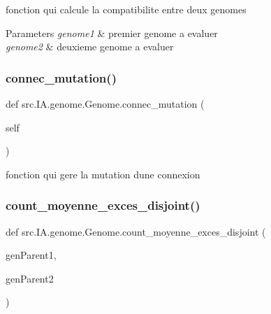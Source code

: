 fonction qui calcule la compatibilite entre deux genomes 


\begin{DoxyParams}{Parameters}
{\em genome1} & premier genome a evaluer \\
\hline
{\em genome2} & deuxieme genome a evaluer \\
\hline
\end{DoxyParams}
\mbox{\label{classsrc_1_1_i_a_1_1genome_1_1_genome_a2b233eb27662060165e583fb4e54f0d0}} 
\subsubsection{\texorpdfstring{connec\+\_\+mutation()}{connec\_mutation()}}
{\footnotesize\ttfamily def src.\+I\+A.\+genome.\+Genome.\+connec\+\_\+mutation (\begin{DoxyParamCaption}\item[{}]{self }\end{DoxyParamCaption})}



fonction qui gere la mutation d\textquotesingle{}une connexion 

\mbox{\label{classsrc_1_1_i_a_1_1genome_1_1_genome_ac41d60cc40e0bbc452046d888196ac8d}} 
\subsubsection{\texorpdfstring{count\+\_\+moyenne\+\_\+exces\+\_\+disjoint()}{count\_moyenne\_exces\_disjoint()}}
{\footnotesize\ttfamily def src.\+I\+A.\+genome.\+Genome.\+count\+\_\+moyenne\+\_\+exces\+\_\+disjoint (\begin{DoxyParamCaption}\item[{}]{gen\+Parent1,  }\item[{}]{gen\+Parent2 }\end{DoxyParamCaption})\hspace{0.3cm}{\ttfamily [static]}}



